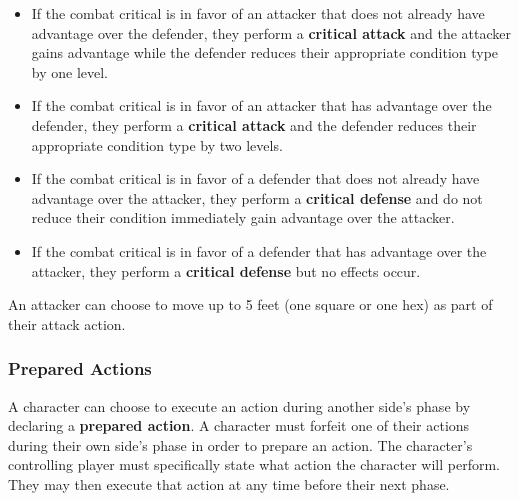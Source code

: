 \documentclass[11pt]{article}
\begin{document}
\begin{itemize}
	\item If the combat critical is in favor of an attacker that does not already have advantage over the defender, they perform a \textbf{critical attack} and the attacker gains advantage while the defender reduces their appropriate condition type by one level.
	\item If the combat critical is in favor of an attacker that has advantage over the defender, they perform a \textbf{critical attack} and the defender reduces their appropriate condition type by two levels.
	\item If the combat critical is in favor of a defender that does not already have advantage over the attacker, they perform a \textbf{critical defense} and do not reduce their condition immediately gain advantage over the attacker.
	\item If the combat critical is in favor of a defender that has advantage over the attacker, they perform a \textbf{critical defense} but no effects occur.
\end{itemize}

An attacker can choose to move up to 5 feet (one square or one hex) as part of their attack action.

\subsubsection{Prepared Actions}
A character can choose to execute an action during another side's phase by declaring a \textbf{prepared action}.
A character must forfeit one of their actions during their own side's phase in order to prepare an action.
The character's controlling player must specifically state what action the character will perform.
They may then execute that action at any time before their next phase.
\end{document}

